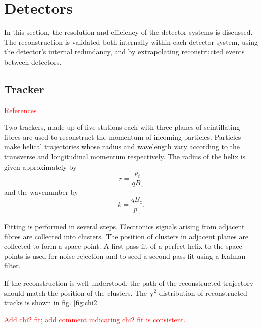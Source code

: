 \section{Detectors}
\label{Sect:Detectors}

In this section, the resolution and efficiency of the detector systems is
discussed. The reconstruction is validated both internally within each
detector system, using the detector's internal redundancy, and by extrapolating
reconstructed events between detectors.

\subsection{Tracker}

\textcolor{red}{References}

Two trackers, made up of five stations each with three planes of scintillating
fibres are used to reconstruct the momentum of incoming particles. Particles 
make helical trajectories whose radius and wavelength vary according to the
transverse and longitudinal momentum respectively. The radius of the helix is
given approximately by
\begin{equation}
\label{eq:scifi_helix_radius}
r = \frac{p_t}{q B_z}
\end{equation}
and the wavenumber by
\begin{equation}
\label{eq:scifi_helix_wavenumber}
k = \frac{q B_z}{p_z}.
\end{equation}

Fitting is performed in several steps. Electronics signals arising from adjacent
fibres are collected into clusters. The position of clusters in adjacent planes 
are collected to form a space point. A first-pass fit of a perfect helix to the 
space points is  used for noise rejection and to seed a second-pass fit using a 
Kalman filter.

If the reconstruction is well-understood, the path of the reconstructed 
trajectory should match the position of the clusters. The $\chi^2$ distribution
of reconstructed tracks is shown in fig. \ref{fig:chi2}.

\textcolor{red}{Add chi2 fit; add comment indicating chi2 fit is consistent.}

